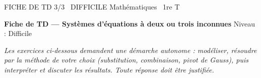 \documentclass[11pt]{article}
\begin{document}
\begin{tcolorbox}[enhanced,colback=popink,colframe=popink,arc=10pt,boxrule=0pt,left=12pt,right=12pt,top=9pt,bottom=9pt]
{\color{white}\popxbold\small FICHE DE TD 3/3 \textbullet\ DIFFICILE \hfill Mathématiques \textbullet\ 1re T\par}
\end{tcolorbox}
\vspace{4pt}
\textbf{Fiche de TD — Systèmes d'équations à deux ou trois inconnues} \hfill Niveau : Difficile

\textit{Les exercices ci-dessous demandent une démarche autonome : modéliser, résoudre par la méthode de votre choix (substitution, combinaison, pivot de Gauss), puis interpréter et discuter les résultats. Toute réponse doit être justifiée.}
\end{document}
